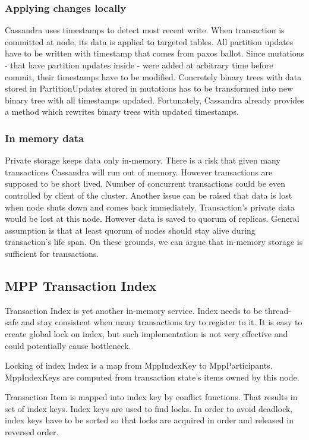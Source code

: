 \subsubsection{Applying changes locally}
Cassandra uses timestamps to detect most recent write. When transaction is committed at node, its data is applied to targeted tables. All partition updates have to be written with timestamp that comes from paxos ballot. Since mutations - that have partition updates inside - were added at arbitrary time before commit, their timestamps have to be modified. Concretely binary trees with data stored in PartitionUpdates stored in mutations has to be transformed into new binary tree with all timestamps updated. Fortunately, Cassandra already provides a method which rewrites binary trees with updated timestamps.


\subsubsection{In memory data}
Private storage keeps data only in-memory. There is a risk that given many transactions Cassandra will run out of memory. However transactions are supposed to be short lived. Number of concurrent transactions could be even controlled by client of the cluster. 
Another issue can be raised that data is lost when node shuts down and comes back immediately. Transaction’s private data would be lost at this node. However data is saved to quorum of replicas. General assumption is that at least quorum of nodes should stay alive during transaction’s life span. On these grounds, we can argue that in-memory storage is sufficient for transactions.



\subsection{MPP Transaction Index}
Transaction Index is yet another in-memory service. Index needs to be thread-safe and stay consistent when many transactions try to register to it. It is easy to create global lock on index, but such implementation is not very effective and could potentially cause bottleneck. 


Locking of index
Index is a map from MppIndexKey to MppParticipants. MppIndexKeys are computed from transaction state’s items owned by this node. 


Transaction Item is mapped into index key by conflict functions. That results in set of index keys. Index keys are used to find locks. In order to avoid deadlock, index keys have to be sorted so that locks are acquired in order and released in reversed order.


